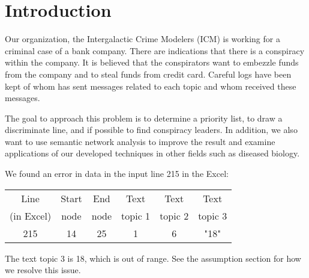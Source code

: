 \documentclass{icmmcm}
\begin{document}


\maketitle
\tableofcontents

\listoffigures
\listoftables  
 

\section{Introduction}%
\label{sec:introduction}


Our organization, the Intergalactic Crime Modelers (ICM) is working
for a criminal case of a bank company. 
There are indications that there is a conspiracy within the company. 
It is believed that the conspirators want to embezzle funds from
the company and to steal funds from credit card.
Careful logs have been kept of whom has sent messages related to each topic and whom received these messages.

The goal to approach this problem is to determine a priority list, 
to draw a discriminate line, and if possible to find
conspiracy leaders. In addition, we also want to use semantic
network analysis to improve the result and examine applications of
our developed techniques in other fields such as diseased biology.



We found an error in data in the input line 215 in the Excel:

\begin{center}	  	
\begin{tabular}{|c|c|c|c|c|c|}	  	
\hline	  	
Line    & Start  & End  & Text   & Text       & Text \\	  	
(in Excel)&  node & node & topic 1 &  topic 2 & topic 3 \\	  	
\hline  	
215 &  14 & 25 &  1  &   6      &      "18"  \\  	
\hline  	
\end{tabular}  	
\end{center}

The text topic 3 is 18, which is out of range.
See the assumption section for how we resolve this issue.
\end{document}
